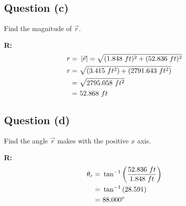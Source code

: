 	\subsection{Question (c)}
		Find the magnitude of $\vec{r}$.

		\textbf{R:} \newline
		\begin{align}
			r = \ &\left| \vec{r} \right| = \sqrt{(1.848 \ ft)^{2} + (52.836 \ ft)^{2}}& \notag \\
			r = \ &\sqrt{(3.415 \ ft^{2}) + (2791.643 \ ft^{2})}& \notag \\
			= \ &\sqrt{2795.058 \ ft^{2}}& \notag \\
			= \ &52.868 \ ft&
		\end{align}

	\subsection{Question (d)}
		Find the angle $\vec{r}$ makes with the positive $x$ axis.

		\textbf{R:} \newline
		\begin{align}
			\theta_{r} = \ &\tan^{-1} \left( \frac{52.836 \ ft}{1.848 \ ft} \right)& \notag \\
			= \ &\tan^{-1} \left( 28.591 \right)& \notag \\
			= \ &88.000^{o}&
		\end{align}
